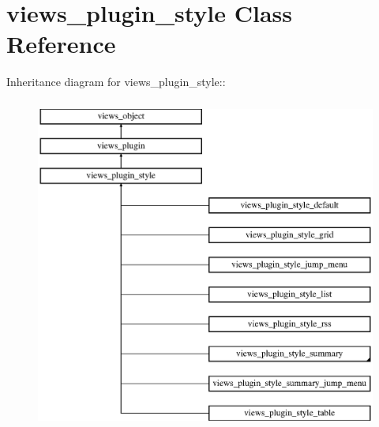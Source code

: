 \hypertarget{classviews__plugin__style}{
\section{views\_\-plugin\_\-style Class Reference}
\label{classviews__plugin__style}
}
Inheritance diagram for views\_\-plugin\_\-style::\begin{figure}[H]
\begin{center}
\leavevmode
\includegraphics[height=11cm]{classviews__plugin__style}
\end{center}
\end{figure}
